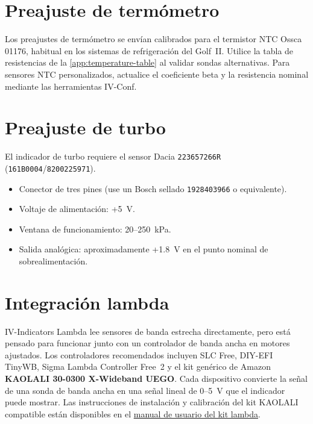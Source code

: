 \section{Preajuste de term\'ometro}
Los preajustes de term\'ometro se env\'ian calibrados para el termistor NTC Ossca\,01176, habitual en los sistemas de refrigeraci\'on del Golf~II. Utilice la tabla de resistencias de la \autoref{app:temperature-table} al validar sondas alternativas. Para sensores NTC personalizados, actualice el coeficiente beta y la resistencia nominal mediante las herramientas IV-Conf.

\section{Preajuste de turbo}
El indicador de turbo requiere el sensor Dacia \texttt{223657266R} (\texttt{161B0004}/\texttt{8200225971}).
\begin{itemize}
    \item Conector de tres pines (use un Bosch sellado \texttt{1928403966} o equivalente).
    \item Voltaje de alimentaci\'on: +5~V.
    \item Ventana de funcionamiento: 20--250~kPa.
    \item Salida anal\'ogica: aproximadamente +1.8~V en el punto nominal de sobrealimentaci\'on.
\end{itemize}

\section{Integraci\'on lambda}
IV-Indicators Lambda lee sensores de banda estrecha directamente, pero est\'a pensado para funcionar junto con un controlador de banda ancha en motores ajustados. Los controladores recomendados incluyen SLC Free, DIY-EFI TinyWB, Sigma Lambda Controller Free~2 y el kit gen\'erico de Amazon \textbf{KAOLALI 30-0300 X-Wideband UEGO}. Cada dispositivo convierte la se\~nal de una sonda de banda ancha en una se\~nal lineal de 0--5~V que el indicador puede mostrar. Las instrucciones de instalaci\'on y calibraci\'on del kit KAOLALI compatible est\'an disponibles en el \href{https://github.com/PHOL-LABS/IV_NANO_UserManual/blob/master/lambda_kit_user_manual.pdf}{manual de usuario del kit lambda}.

